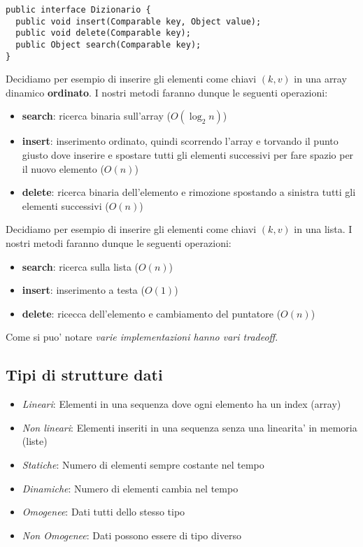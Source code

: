 \documentclass{article}
\begin{document}
\begin{lstlisting}
public interface Dizionario {
  public void insert(Comparable key, Object value);
  public void delete(Comparable key);
  public Object search(Comparable key);
}
\end{lstlisting}

Decidiamo per esempio di inserire gli elementi come chiavi $(k, v)$ in una array dinamico \textbf{ordinato}.
I nostri metodi faranno dunque le seguenti operazioni:
\begin{itemize}
  \item \textbf{search}: ricerca binaria sull'array ($O(\log_2 n)$)
  \item \textbf{insert}: inserimento ordinato, quindi scorrendo l'array e
    torvando il punto giusto dove inserire e spostare tutti gli elementi
    successivi per fare spazio per il nuovo elemento ($O(n)$)
  \item \textbf{delete}: ricerca binaria dell'elemento e rimozione spostando a
  sinistra tutti gli elementi successivi ($O(n)$)
\end{itemize}

Decidiamo per esempio di inserire gli elementi come chiavi $(k, v)$ in una lista.
I nostri metodi faranno dunque le seguenti operazioni:
\begin{itemize}
  \item \textbf{search}: ricerca sulla lista ($O(n)$)
  \item \textbf{insert}: inserimento a testa ($O(1)$) 
  \item \textbf{delete}: ricecca dell'elemento e cambiamento del puntatore ($O(n)$)
\end{itemize}

Come si puo' notare \emph{varie implementazioni hanno vari tradeoff}.

\subsection{Tipi di strutture dati}

\begin{itemize}
  \item \emph{Lineari}: Elementi in una sequenza dove ogni elemento ha un index (array)
  \item \emph{Non lineari}: Elementi inseriti in una sequenza senza una linearita' in memoria (liste)

  \item \emph{Statiche}: Numero di elementi sempre costante nel tempo
  \item \emph{Dinamiche}: Numero di elementi cambia nel tempo

  \item \emph{Omogenee}: Dati tutti dello stesso tipo
  \item \emph{Non Omogenee}: Dati possono essere di tipo diverso
\end{itemize}
\end{document}
